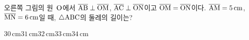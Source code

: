 \noindent\begin{minipage}[t]{0.58\linewidth}\vspace{0pt}\raggedright 오른쪽 그림의 원~$\mathrm{O}$에서 $\overline{\mathrm{AB}}\perp\overline{\mathrm{OM}}$, $\overline{\mathrm{AC}}\perp\overline{\mathrm{ON}}$이고 $\overline{\mathrm{OM}}=\overline{\mathrm{ON}}$이다. $\overline{\mathrm{AM}}=5\,\mathrm{cm}$, $\overline{\mathrm{MN}}=6\,\mathrm{cm}$일 때, $\triangle\mathrm{ABC}$의 둘레의 길이는?\end{minipage}\hfill\begin{minipage}[t]{0.4\linewidth}\vspace{0pt}\centering \resizebox{\ifdim\width>\linewidth\linewidth\else\width\fi}{!}{}\end{minipage}\par
\begin{choicesii}{$30\,\mathrm{cm}$}{$31\,\mathrm{cm}$}{$32\,\mathrm{cm}$}{$33\,\mathrm{cm}$}{$34\,\mathrm{cm}$}\end{choicesii}
